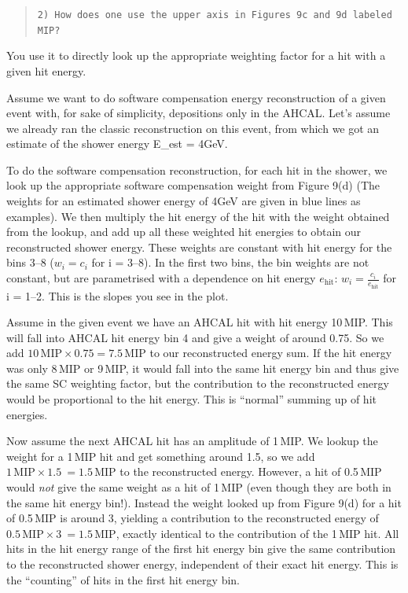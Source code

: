 \documentclass[twoside,a4paper,12pt]{article}
\begin{document}
\begin{quote}\texttt{2) How does one use the upper axis in Figures 9c and 9d labeled MIP?}\end{quote}
You use it to directly look up the appropriate weighting factor for a hit with a given hit energy.

Assume we want to do software compensation energy reconstruction of a given event with, for sake of simplicity, depositions only in the AHCAL. Let's assume we already ran the classic reconstruction on this event, from which we got an estimate of the shower energy E\_est = 4GeV.

To do the software compensation reconstruction, for each hit in the shower, we look up the appropriate software compensation weight from Figure 9(d) (The weights for an estimated shower energy of 4GeV are given in blue lines as examples). We then multiply the hit energy of the hit with the weight obtained from the lookup, and add up all these weighted hit energies to obtain our reconstructed shower energy. These weights are constant with hit energy for the bins 3--8 ($w_i = c_i$ for i = 3--8). In the first two bins, the bin weights are not constant, but are parametrised with a dependence on hit energy $e_\text{hit}$: $w_i = \frac{c_i}{e_\text{hit}}$ for i = 1--2. This is the slopes you see in the plot.

Assume in the given event we have an AHCAL hit with hit energy 10\,MIP. This will fall into AHCAL hit energy bin 4 and give a weight of around 0.75. So we add $10\,\text{MIP} \times 0.75 = 7.5\,\text{MIP}$ to our reconstructed energy sum. If the hit energy was only 8\,MIP or 9\,MIP, it would fall into the same hit energy bin and thus give the same SC weighting factor, but the contribution to the reconstructed energy would be proportional to the hit energy. This is ``normal'' summing up of hit energies.

Now assume the next AHCAL hit has an amplitude of 1\,MIP. We lookup the weight for a 1\,MIP hit and get something around 1.5, so we add $1\,\text{MIP} \times 1.5 \ = 1.5\,\text{MIP}$ to the reconstructed energy. However, a hit of 0.5\,MIP would \emph{not} give the same weight as a hit of 1\,MIP (even though they are both in the same hit energy bin!). Instead the weight looked up from Figure 9(d) for a hit of 0.5\,MIP is around 3, yielding a contribution to the reconstructed energy of $0.5\,\text{MIP} \times 3 \ = 1.5\,\text{MIP}$, exactly identical to the contribution of the 1\,MIP hit. All hits in the hit energy range of the first hit energy bin give the same contribution to the reconstructed shower energy, independent of their exact hit energy. This is the ``counting'' of hits in the first hit energy bin. 
\end{document}
